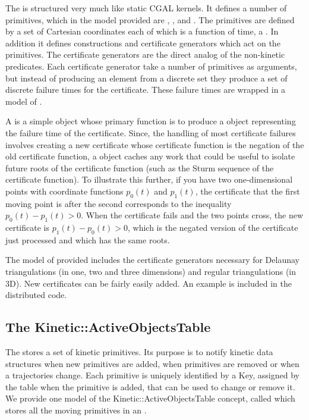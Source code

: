 The  is structured very much like static CGAL
kernels. It defines a number of primitives, which in the model
provided are ,
,  and
. The primitives are defined by
a set of Cartesian coordinates each of which is a function of time, a
. In addition it defines constructions
and certificate generators which act on the primitives.  The
certificate generators are the direct analog of the non-kinetic
predicates. Each certificate generator take a number of primitives as
arguments, but instead of producing an element from a discrete set
they produce a set of discrete failure times for the certificate.
These failure times are wrapped in a model of .

A  is a simple object whose primary function is to
produce a  object representing the failure time of the
certificate.  Since, the handling of most certificate failures
involves creating a new certificate whose certificate function is the
negation of the old certificate function, a 
object caches any work that could be useful to isolate future roots of
the certificate function (such as the Sturm sequence of the
certificate function). To illustrate this further, if you have two
one-dimensional points with coordinate functions $p_0(t)$ and
$p_1(t)$, the certificate that the first moving point is after the
second corresponds to the inequality $p_0(t) - p_1(t) > 0$.  When the
certificate fails and the two points cross, the new certificate is
$p_1(t)- p_0(t) > 0$, which is the negated version of the certificate
just processed and which has the same roots.

The model of  provided includes the certificate
generators necessary for Delaunay triangulations (in one, two and
three dimensions) and regular triangulations (in 3D).  New
certificates can be fairly easily added. An example is included in the
distributed code.



\subsection{The Kinetic::ActiveObjectsTable}
\label{active_objects_table}

The  stores a set of kinetic primitives.
Its purpose is to notify kinetic data structures when new primitives
are added, when primitives are removed or when a trajectories change.
Each primitive is uniquely identified by a Key, assigned by
the table when the primitive is added, that can be used to change or
remove it.  We provide one model of the
Kinetic::ActiveObjectsTable concept, called
 which stores all the moving
primitives in an .

